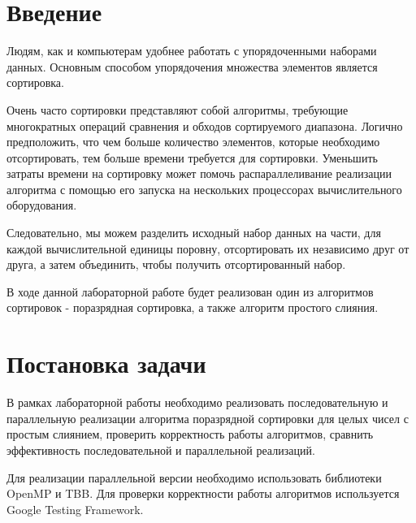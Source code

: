 \documentclass{report}
\begin{document}
\setcounter{page}{2}

\tableofcontents
\newpage

\section*{Введение}
Людям, как и компьютерам удобнее работать с упорядоченными наборами данных. Основным способом упорядочения множества элементов является сортировка.
\par Очень часто сортировки представляют собой алгоритмы, требующие многократных операций сравнения и обходов сортируемого диапазона. Логично предположить, что чем больше количество элементов, которые необходимо отсортировать, тем больше времени требуется для сортировки. Уменьшить затраты времени на сортировку может помочь распараллеливание реализации алгоритма с помощью его запуска на нескольких процессорах вычислительного оборудования.
\par Следовательно, мы можем разделить исходный набор данных на части, для каждой вычислительной единицы поровну, отсортировать их независимо друг от друга, а затем объединить, чтобы получить отсортированный набор.
\par В ходе данной лабораторной работе будет реализован один из алгоритмов сортировок - поразрядная сортировка, а также алгоритм простого слияния.

\newpage

\section*{Постановка задачи}
В рамках лабораторной работы необходимо реализовать последовательную и параллельную реализации алгоритма поразрядной сортировки для целых чисел с простым слиянием, проверить корректность работы алгоритмов, сравнить эффективность последовательной и параллельной реализаций.
\par Для реализации параллельной версии необходимо использовать библиотеки OpenMP и TBB. Для проверки корректности работы алгоритмов используется Google Testing Framework.
\newpage

\end{document}
